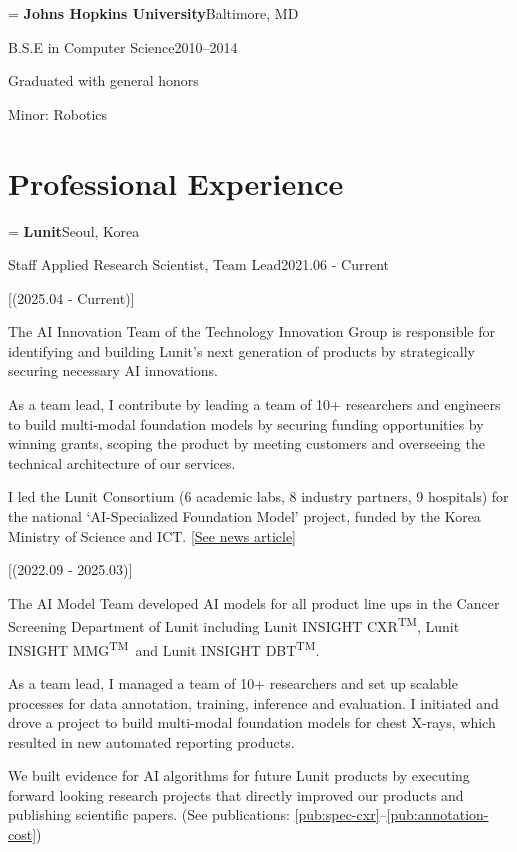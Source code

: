 \documentclass[11pt,letterpaper]{article}
\makeatletter
\newlength{\entryindent}\setlength{\entryindent}{13.94pt}
\newcommand{\entry}[4]{%
  \par\if@nobreak\vskip 2.3pt\else\vskip 8.3pt\fi
  {\leftskip=\entryindent\rightskip=1.87pt
   \textbf{#1}\hfill #2\par\nobreak\vskip 1.5pt
   {\small #3\hfill #4\par}}\nobreak}
\newenvironment{cvitemsdark}
  {\begin{cvitems}[label={\bfseries --}, before=\small\color{ink}, topsep=4.1pt, after=\vspace{-3.8pt}]}
  {\end{cvitems}}
\newcommand{\pubref}[1]{\ref{pub:#1}}
\newcommand{\TM}{\textsuperscript{TM}}
\makeatother
\begin{document}
\entry{Johns Hopkins University}{Baltimore, MD}
      {B.S.E in Computer Science}{2010--2014}
\begin{cvitemsdark}
  \item Graduated with general honors
  \item Minor: Robotics
\end{cvitemsdark}

\section*{Professional Experience}

\entry{Lunit}{Seoul, Korea}
      {Staff Applied Research Scientist, Team Lead}{2021.06 - Current}
\begin{cvitems}
  [(2025.04 - Current)]
  \item The AI Innovation Team of the Technology Innovation Group is responsible for identifying and building Lunit's
        next generation of products by strategically securing necessary AI innovations.
  \item As a team lead, I contribute by leading a team of 10+ researchers and engineers to build multi-modal
        foundation models by securing funding opportunities by winning grants, scoping the product by meeting
        customers and overseeing the technical architecture of our services.
  \item I led the Lunit Consortium (6 academic labs, 8 industry partners, 9 hospitals) for the national
        `AI-Specialized Foundation Model' project, funded by the Korea Ministry of Science and ICT.
        \href{https://medigatenews.com/news/2040726640}{[See news article]}

  [(2022.09 - 2025.03)]
  \item The AI Model Team developed AI models for all product line ups in the Cancer Screening Department of Lunit
        including Lunit INSIGHT CXR\TM, Lunit INSIGHT MMG\TM\ and Lunit INSIGHT DBT\TM.
  \item As a team lead, I managed a team of 10+ researchers and set up scalable processes for data annotation,
        training, inference and evaluation. I initiated and drove a project to build multi-modal foundation models
        for chest X-rays, which resulted in new automated reporting products.
  \item We built evidence for AI algorithms for future Lunit products by executing forward looking research projects
        that directly improved our products and publishing scientific papers.
        (See publications: \pubref{spec-cxr}--\pubref{annotation-cost})


\end{cvitems}
\end{document}
